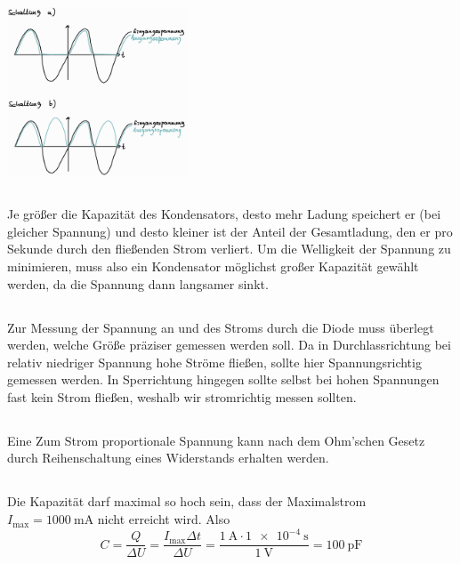 \documentclass{article}
\newcommand{\defc}{black}
\newcommand{\colorT}[2][blue]{\color{#1}{#2}\color{\defc}}
\newcommand{\question}[1]{\colorT[purple]{\textbf{(#1)}}}
\newcommand{\mr}{\mathrm}
\begin{document}
\subsection{}
{\centering \includegraphics[width=0.4\textwidth]{aufgabeD}}

\subsection{}
Je größer die Kapazität des Kondensators, desto mehr Ladung speichert er (bei gleicher Spannung)
und desto kleiner ist der Anteil der Gesamtladung, den er pro Sekunde durch den fließenden Strom verliert.
Um die Welligkeit der Spannung zu minimieren, muss also ein Kondensator möglichst großer Kapazität gewählt werden,
da die Spannung dann langsamer sinkt.

\subsection{}
Zur Messung der Spannung an und des Stroms durch die Diode muss überlegt werden, welche Größe präziser gemessen werden soll.
Da in Durchlassrichtung bei relativ niedriger Spannung hohe Ströme fließen, sollte hier Spannungsrichtig gemessen werden.
In Sperrichtung hingegen sollte selbst bei hohen Spannungen fast kein Strom fließen, weshalb wir stromrichtig messen sollten.

\subsection{}
Eine Zum Strom proportionale Spannung kann nach dem Ohm'schen Gesetz durch Reihenschaltung eines Widerstands erhalten werden.

\subsection{}
\question{Ich versteh gar nix}
Die Kapazität darf maximal so hoch sein, dass der Maximalstrom $I_\mr{max} = \SI{1000}{\mA}$ nicht erreicht wird. Also
\begin{equation}
  C = \frac{Q}{\Delta U} = \frac{I_\mr{max} \Delta t}{\Delta U} = \frac{\SI{1}{\A} \cdot \SI{1e-4}{\s}}{\SI{1}{\V}} = \SI{100}{\pF}
\end{equation}
\end{document}
